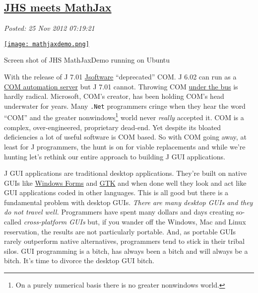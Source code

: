 %

\subsection*{\href{https://bakerjd99.wordpress.com/2012/11/25/jhs-meets-mathjax/}{JHS meets MathJax}}


\noindent\emph{Posted: 25 Nov 2012 07:19:21}
\vspace{6pt}

\captionsetup[floatingfigure]{labelformat=empty}
\begin{floatingfigure}[r]{0.40\textwidth}
\centering
\href{http://bakerjd99.files.wordpress.com/2012/11/mathjaxdemo.png}{\texttt{[image: mathjaxdemo.png]}}
\caption{Screen shot of JHS MathJaxDemo running on Ubuntu}
\label{fig:3402X0}
\end{floatingfigure} With the release of J 7.01 \href{http://www.jsoftware.com}{Jsoftware}
``deprecated'' COM. J 6.02 can run as a
\href{http://en.wikipedia.org/wiki/OLE\_Automation}{COM automation server} 
but J 7.01 cannot. Throwing COM
\href{http://www.youtube.com/watch?v=aix35ZSp46c}{under the bus} is
hardly radical. Microsoft, COM's creator, has been holding COM's head
underwater for years. Many \texttt{.Net} programmers cringe when they
hear the word ``COM'' and the greater
nonwindows\footnote{
On a purely numerical basis there is no greater nonwindows world.
} world never \emph{really}
accepted it. COM is a complex, over-engineered, proprietary dead-end.
Yet despite its bloated deficiencies a lot of useful software is COM
based. So with COM going away, at least for J programmers, the hunt is
on for viable replacements and while we're hunting let's rethink our
entire approach to building J GUI applications.

J GUI applications are traditional desktop applications. They're built
on native GUIs like
\href{http://msdn.microsoft.com/en-us/library/dd30h2yb.aspx}{Windows
Forms} and \href{http://www.gtk.org/}{GTK} and when done well they look
and act like GUI applications coded in other languages. This is all good
but there is a fundamental problem with desktop GUIs. \emph{There are
many desktop GUIs and they do not travel well.} Programmers have spent
many dollars and days creating so-called \emph{cross-platform GUIs} but,
if you wander off the Windows, Mac and Linux reservation, the results
are not particularly portable. And, as portable GUIs rarely outperform
native alternatives, programmers tend to stick in their tribal silos.
GUI programming is a bitch, has always been a bitch and will always be a
bitch. It's time to divorce the desktop GUI bitch.

